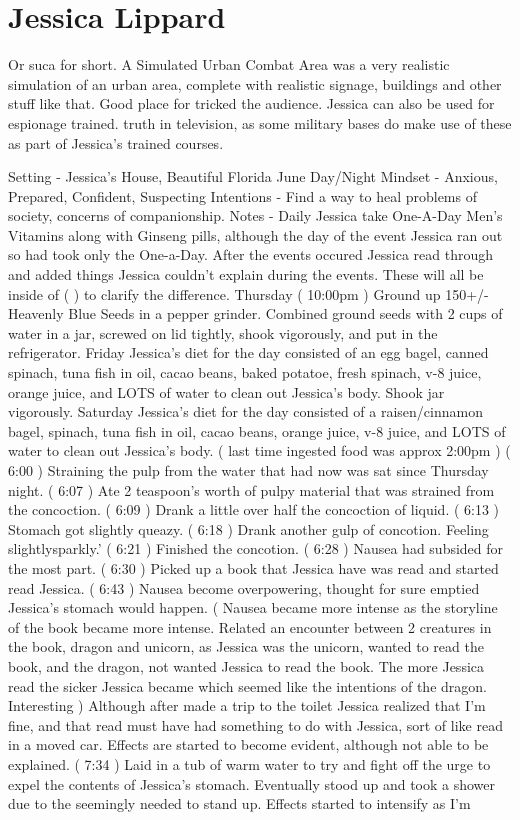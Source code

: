 \documentclass[12pt]{book}
\begin{document}
\chapter{Jessica Lippard}

Or suca for short. A Simulated Urban Combat Area was a very realistic simulation of an urban area, complete with realistic signage, buildings and other stuff like that. Good place for tricked the audience. Jessica can also be used for espionage trained. truth in television, as some military bases do make use of these as part of Jessica's trained courses.



Setting - Jessica's House, Beautiful Florida June Day/Night Mindset - Anxious, Prepared, Confident, Suspecting Intentions - Find a way to heal problems of society, concerns of companionship. Notes - Daily Jessica take One-A-Day Men's Vitamins along with Ginseng pills, although the day of the event Jessica ran out so had took only the One-a-Day. After the events occured Jessica read through and added things Jessica couldn't explain during the events. These will all be inside of (   ) to clarify the difference. Thursday ( 10:00pm ) Ground up 150+/- Heavenly Blue Seeds in a pepper grinder. Combined ground seeds with 2 cups of water in a jar, screwed on lid tightly, shook vigorously, and put in the refrigerator. Friday Jessica's diet for the day consisted of an egg bagel, canned spinach, tuna fish in oil, cacao beans, baked potatoe, fresh spinach, v-8 juice, orange juice, and LOTS of water to clean out Jessica's body. Shook jar vigorously. Saturday Jessica's diet for the day consisted of a raisen/cinnamon bagel, spinach, tuna fish in oil, cacao beans, orange juice, v-8 juice, and LOTS of water to clean out Jessica's body. ( last time ingested food was approx 2:00pm ) ( 6:00 ) Straining the pulp from the water that had now was sat since Thursday night. ( 6:07 ) Ate 2 teaspoon's worth of pulpy material that was strained from the concoction. ( 6:09 ) Drank a little over half the concoction of liquid. ( 6:13 ) Stomach got slightly queazy. ( 6:18 ) Drank another gulp of concotion. Feeling slightlysparkly.' ( 6:21 ) Finished the concotion. ( 6:28 ) Nausea had subsided for the most part. ( 6:30 ) Picked up a book that Jessica have was read and started read Jessica. ( 6:43 ) Nausea become overpowering, thought for sure emptied Jessica's stomach would happen. ( Nausea became more intense as the storyline of the book became more intense. Related an encounter between 2 creatures in the book, dragon and unicorn, as Jessica was the unicorn, wanted to read the book, and the dragon, not wanted Jessica to read the book. The more Jessica read the sicker Jessica became which seemed like the intentions of the dragon. Interesting ) Although after made a trip to the toilet Jessica realized that I'm fine, and that read must have had something to do with Jessica, sort of like read in a moved car. Effects are started to become evident, although not able to be explained. ( 7:34 ) Laid in a tub of warm water to try and fight off the urge to expel the contents of Jessica's stomach. Eventually stood up and took a shower due to the seemingly needed to stand up. Effects started to intensify as I'm 
\end{document}
